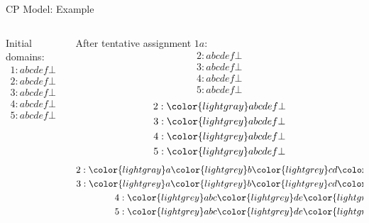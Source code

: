 \documentclass{beamer}
\begin{document}
\begin{frame}{CP Model: Example}
  \begin{columns}[T]
    \begin{column}{0.47\textwidth}
      Initial domains:
      \begin{gather*}
        1: a b c d e f \bot \\
        2: a b c d e f \bot \\
        3: a b c d e f \bot \\
        4: a b c d e f \bot \\
        5: a b c d e f \bot
      \end{gather*}
    \end{column}
    \begin{column}{0.47\textwidth}
      After tentative assignment $1a$:
         {
          \begin{gather*}
            2: a b c d e f \bot \\
            3: a b c d e f \bot \\
            4: a b c d e f \bot \\
            5: a b c d e f \bot
          \end{gather*}
        }
         {
          \begin{gather*}
            2: {\color{lightgray}a} b c d e f \bot \\
            3: {\color{lightgrey}a} b c d e f \bot \\
            4: {\color{lightgrey}a} b c d e f \bot \\
            5: {\color{lightgrey}a} b c d e f \bot
          \end{gather*}
        }
         {
          \begin{gather*}
            2: {\color{lightgray}a} {\color{lightgrey}b} {\color{lightgrey}c} d {\color{lightgrey}e} f \bot \\
            3: {\color{lightgrey}a} {\color{lightgrey}b} {\color{lightgrey}c} d {\color{lightgrey}e} f \bot \\
            4: {\color{lightgrey}a} b c {\color{lightgrey}d} e {\color{lightgrey}f} \bot \\
            5: {\color{lightgrey}a} b c {\color{lightgrey}d} e {\color{lightgrey}f} \bot
          \end{gather*}
        }
    \end{column}
  \end{columns}
\end{frame}
\end{document}
